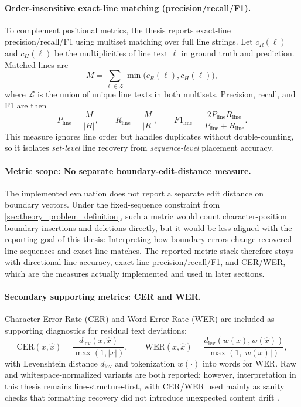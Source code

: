 \paragraph{Order-insensitive exact-line matching (precision/recall/F1).}
To complement positional metrics, the thesis reports exact-line precision/recall/F1 using multiset matching over full line strings. Let $c_R(\ell)$ and $c_H(\ell)$ be the multiplicities of line text $\ell$ in ground truth and prediction. Matched lines are
\begin{equation}
M=\sum_{\ell\in\mathcal{L}}\min\!\big(c_R(\ell),c_H(\ell)\big),
\label{eq:exact_line_matches}
\end{equation}
where $\mathcal{L}$ is the union of unique line texts in both multisets. Precision, recall, and F1 are then
\begin{equation}
P_{\mathrm{line}}=\frac{M}{|H|},\qquad
R_{\mathrm{line}}=\frac{M}{|R|},\qquad
F1_{\mathrm{line}}=\frac{2P_{\mathrm{line}}R_{\mathrm{line}}}{P_{\mathrm{line}}+R_{\mathrm{line}}}.
\label{eq:exact_line_prf}
\end{equation}
This measure ignores line order but handles duplicates without double-counting, so it isolates \emph{set-level} line recovery from \emph{sequence-level} placement accuracy.

\paragraph{Metric scope: No separate boundary-edit-distance measure.}
The implemented evaluation does not report a separate edit distance on boundary vectors. Under the fixed-sequence constraint from \autoref{sec:theory_problem_definition}, such a metric would count character-position boundary insertions and deletions directly, but it would be less aligned with the reporting goal of this thesis: Interpreting how boundary errors change recovered line sequences and exact line matches. The reported metric stack therefore stays with directional line accuracy, exact-line precision/recall/F1, and CER/WER, which are the measures actually implemented and used in later sections.

\paragraph{Secondary supporting metrics: CER and WER.}
Character Error Rate (CER) and Word Error Rate (WER) are included as supporting diagnostics for residual text deviations:
\begin{equation}
\mathrm{CER}(x,\hat{x})=\frac{d_{\mathrm{lev}}(x,\hat{x})}{\max(1,|x|)},\qquad
\mathrm{WER}(x,\hat{x})=\frac{d_{\mathrm{lev}}(w(x),w(\hat{x}))}{\max(1,|w(x)|)},
\label{eq:cer_wer}
\end{equation}
with Levenshtein distance $d_{\mathrm{lev}}$ and tokenization $w(\cdot)$ into words for WER. Raw and whitespace-normalized variants are both reported; however, interpretation in this thesis remains line-structure-first, with CER/WER used mainly as sanity checks that formatting recovery did not introduce unexpected content drift .

